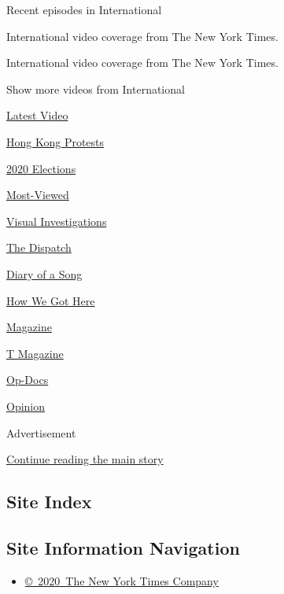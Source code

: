 Recent episodes in International

International video coverage from The New York Times.

International video coverage from The New York Times.

Show more videos from International

\href{/video}{}

\href{/video/latest-video}{Latest Video}

\href{/video/hk-protest}{Hong Kong Protests}

\href{/video/2020-Elections}{2020 Elections}

\href{/video/Most-Viewed}{Most-Viewed}

\href{/video/investigations}{Visual Investigations}

\href{/video/on-the-ground}{The Dispatch}

\href{/video/diaryofasong}{Diary of a Song}

\href{/video/how-we-got-here}{How We Got Here}

\href{/video/magazine}{Magazine}

\href{/video/t-magazine}{T Magazine}

\href{/video/op-docs}{Op-Docs}

\href{/video/opinion}{Opinion}

Advertisement

\protect\hyperlink{after-bottom}{Continue reading the main story}

\hypertarget{site-index}{%
\subsection{Site Index}\label{site-index}}

\hypertarget{site-information-navigation}{%
\subsection{Site Information
Navigation}\label{site-information-navigation}}

\begin{itemize}
\tightlist
\item
  \href{https://help.nytimes3xbfgragh.onion/hc/en-us/articles/115014792127-Copyright-notice}{©~2020~The
  New York Times Company}
\end{itemize}

